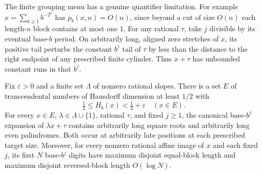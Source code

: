 The finite grouping menu has a genuine quantifier limitation. For example \(x=\sum_{k\ge1} b^{-2^k}\) has \(p_b(x,n)=O(n)\), since beyond a cut of size \(O(n)\) each length-\(n\) block contains at most one \(1\). For any rational \(\tau\), take \(j\) divisible by its eventual base-\(b\) period. On arbitrarily long, aligned zero stretches of \(x\), its positive tail perturbs the constant \(b^j\) tail of \(\tau\) by less than the distance to the right endpoint of any prescribed finite cylinder. Thus \(x+\tau\) has unbounded constant runs in that \(b^j\).

\begin{theorem}\label{thm:entropy-sharpness}
Fix \(\varepsilon>0\) and a finite set \(\Lambda\) of nonzero rational slopes. There is a set \(E\) of transcendental numbers of Hausdorff dimension at least \(1/2\) with
\[
                   \tfrac12\le H_b(x)<\tfrac12+\varepsilon\quad(x\in E).
\]
For every \(x\in E\), \(\lambda\in\Lambda\cup\{1\}\), rational \(\tau\), and fixed \(j\ge1\), the canonical base-\(b^j\) expansion of \(\lambda x+\tau\) contains arbitrarily long square roots and arbitrarily long even palindromes. Both occur at arbitrarily late positions at each prescribed target size. Moreover, for every nonzero rational affine image of \(x\) and each fixed \(j\), its first \(N\) base-\(b^j\) digits have maximum disjoint equal-block length and maximum disjoint reversed-block length \(O(\log N)\).
\end{theorem}

